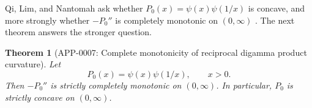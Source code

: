 \documentclass[11pt]{article}
\numberwithin{equation}{section}
\newtheorem{theorem}{Theorem}[section]
\theoremstyle{definition}
\theoremstyle{remark}
\newcommand{\1}{\mathbf 1}
\begin{document}
Qi, Lim, and Nantomah ask whether \(P_0(x)=\psi(x)\psi(1/x)\) is concave, and more strongly whether \(-P_0''\) is completely monotonic on \((0,\infty)\) \cite{qi-lim-nantomah-polygamma}.  The next theorem answers the stronger question.

\begin{theorem}[APP-0007: Complete monotonicity of reciprocal digamma product curvature]
\label{thm:reciprocal-digamma-product-complete-monotonicity}
Let
\begin{equation}
\label{eq:reciprocal-digamma-p0}
P_0(x)=\psi(x)\psi(1/x),\qquad x>0.
\end{equation}
Then \(-P_0''\) is strictly completely monotonic on \((0,\infty)\).  In particular, \(P_0\) is strictly concave on \((0,\infty)\).
\end{theorem}
\end{document}

